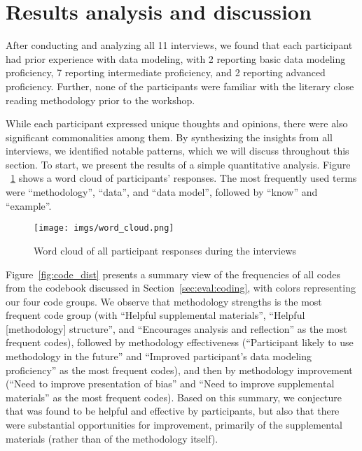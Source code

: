 \section{Results analysis and discussion}
\label{sec:discussion}

After conducting and analyzing all 11 interviews, we found that each participant had prior experience with data modeling, with 2 reporting basic data modeling proficiency, 7 reporting intermediate proficiency, and 2 reporting advanced proficiency. Further, none of the participants were familiar with the literary close reading methodology prior to the workshop.

While each participant expressed unique thoughts and opinions, there were also significant commonalities among them. By synthesizing the insights from all interviews, we identified notable patterns, which we will discuss throughout this section.  To start, we present the results of a simple quantitative analysis.  Figure ~\ref{fig:word_cloud} shows a word cloud of participants' responses.  The most frequently used terms were ``methodology'', ``data'', and ``data model'',  followed by ``know'' and ``example''.

\begin{figure}
    \centering
    \texttt{[image: imgs/word\_cloud.png]}
    \caption{Word cloud of all participant responses during the interviews}
    \label{fig:word_cloud}
\end{figure}

Figure~\ref{fig:code_dist} presents a summary view of the frequencies of all codes from the codebook discussed in Section~\ref{sec:eval:coding}, with colors representing our four code groups.  We observe that methodology strengths is the most frequent code group (with ``Helpful supplemental materials'', ``Helpful [methodology] structure'', and ``Encourages analysis and reflection'' as the most frequent codes), followed by methodology effectiveness (``Participant likely to use methodology in the future'' and ``Improved participant's data modeling proficiency'' as the most frequent codes), and then by methodology improvement (``Need to improve presentation of bias'' and ``Need to improve supplemental materials'' as the most frequent codes).  Based on this summary, we conjecture that \credal was found to be helpful and effective by participants, but also that there were substantial opportunities for improvement, primarily of the supplemental materials (rather than of the methodology itself).

